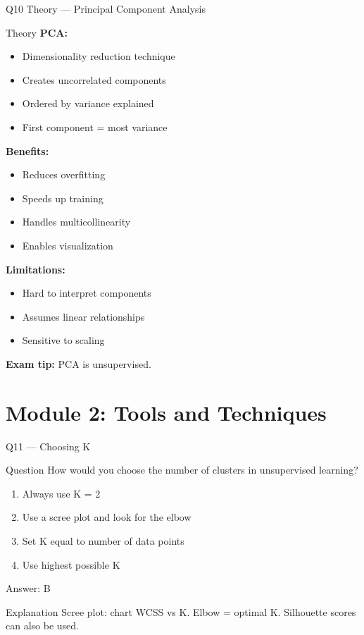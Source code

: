 \documentclass[aspectratio=169,8pt]{beamer}
\begin{document}
	\begin{frame}{Q10 Theory --- Principal Component Analysis}
		\begin{block}{Theory}
			\textbf{PCA:}
			\begin{itemize}
				\item Dimensionality reduction technique
				\item Creates uncorrelated components
				\item Ordered by variance explained
				\item First component = most variance
			\end{itemize}
			\textbf{Benefits:}
			\begin{itemize}
				\item Reduces overfitting
				\item Speeds up training
				\item Handles multicollinearity
				\item Enables visualization
			\end{itemize}
			\textbf{Limitations:}
			\begin{itemize}
				\item Hard to interpret components
				\item Assumes linear relationships
				\item Sensitive to scaling
			\end{itemize}
			\textbf{Exam tip:} PCA is unsupervised.
		\end{block}
	\end{frame}
	
	\section{Module 2: Tools and Techniques}
	
	\begin{frame}{Q11 --- Choosing K}
		\begin{block}{Question}
			How would you choose the number of clusters in unsupervised learning?
		\end{block}
		\begin{enumerate}[label=\Alph*.]
			\item Always use K = 2
			\item Use a scree plot and look for the elbow
			\item Set K equal to number of data points
			\item Use highest possible K
		\end{enumerate}
		\begin{exampleblock}{Answer: B}
		\end{exampleblock}
		\begin{block}{Explanation}
			Scree plot: chart WCSS vs K. Elbow = optimal K. Silhouette scores can also be used.
		\end{block}
	\end{frame}
	
\end{document}
